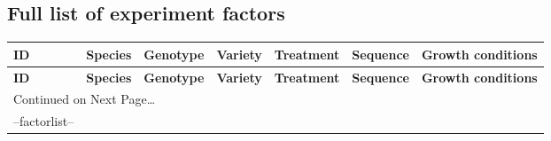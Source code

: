\documentclass[%
  paper=a4, %
  pagesize, %
  DIV=calc, %
  headings=small,%
  english,   %
  oneside
]{scrartcl}  %
\providecommand{\tabularnewline}{\\}
\begin{document}
\subsection{Full list of experiment factors}
\begin{center}
	\begin{longtable}{|p{0.7cm}|p{2.2cm}|p{2.2cm}|p{2.2cm}|p{2.2cm}|p{2.2cm}|p{2.2cm}|}
	
	
	\hline
	{\textbf{ID}} & 
	{\textbf{Species}} & 
	{\textbf{Genotype}} & 
	{\textbf{Variety}} &
	{\textbf{Treatment}} & 
	{\textbf{Sequence}} & 
	{\textbf{Growth conditions}}
	\tabularnewline
	\hline
	\hline
	\endfirsthead
	
	 
	\hline
	{\textbf{ID}} & 
	{\textbf{Species}} & 
	{\textbf{Genotype}} & 
	{\textbf{Variety}} &
	{\textbf{Treatment}} & 
	{\textbf{Sequence}} & 
	{\textbf{Growth conditions}}
	\tabularnewline
	\hline
	\hline
	\endhead
	
	
	\multicolumn{7}{l}{{Continued on Next Page\ldots}} 
	\tabularnewline
	\endfoot
	
	
	\hline \hline
	\endlastfoot

	--factorlist--

	\end{longtable}
\end{center}

% 
\end{document}
